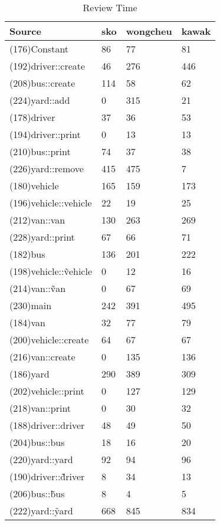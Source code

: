 \begin{table}[hb]
\begin{center}
\begin{tabular}{|l|l|l|l|}
\hline
Source & sko & wongcheu & kawak\\
\hline
(176)Constant & 86 & 77 & 81\\
(192)driver::create & 46 & 276 & 446\\
(208)bus::create & 114 & 58 & 62\\
(224)yard::add & 0 & 315 & 21\\
(178)driver & 37 & 36 & 53\\
(194)driver::print & 0 & 13 & 13\\
(210)bus::print & 74 & 37 & 38\\
(226)yard::remove & 415 & 475 & 7\\
(180)vehicle & 165 & 159 & 173\\
(196)vehicle::vehicle & 22 & 19 & 25\\
(212)van::van & 130 & 263 & 269\\
(228)yard::print & 67 & 66 & 71\\
(182)bus & 136 & 201 & 222\\
(198)vehicle::\~vehicle & 0 & 12 & 16\\
(214)van::\~van & 0 & 67 & 69\\
(230)main & 242 & 391 & 495\\
(184)van & 32 & 77 & 79\\
(200)vehicle::create & 64 & 67 & 67\\
(216)van::create & 0 & 135 & 136\\
(186)yard & 290 & 389 & 309\\
(202)vehicle::print & 0 & 127 & 129\\
(218)van::print & 0 & 30 & 32\\
(188)driver::driver & 48 & 49 & 50\\
(204)bus::bus & 18 & 16 & 20\\
(220)yard::yard & 92 & 94 & 96\\
(190)driver::\~driver & 8 & 34 & 13\\
(206)bus::\~bus & 8 & 4 & 5\\
(222)yard::\~yard & 668 & 845 & 834\\
\hline
\end{tabular}
\end{center}
\caption{Review Time}
\end{table}


